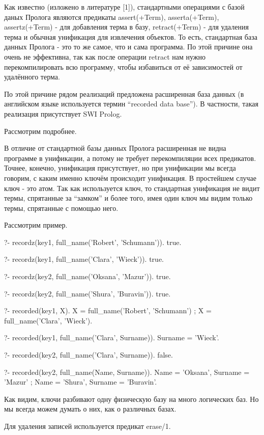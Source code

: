 \documentclass[a4paper]{book}
\begin{document}
Как известно (изложено в литературе [1]), стандартными операциями
с базой даных Пролога являются предикаты  assert(+Term),
asserta(+Term), assertz(+Term) - для добавления терма в базу,
retract(+Term) - для удаления терма и обычная унификация для
извлечения объектов. То есть, стандартная база данных Пролога -
это то же самое, что и сама программа. По этой причине она очень
не эффективна, так как после операции retract нам нужно
перекомпилировать всю программу, чтобы избавиться от её
зависимостей от удалённого терма.

По этой причине рядом реализаций предложена расширенная база
данных (в английском языке используется термин ``recorded data
base''). В частности, такая реализация присутствует SWI Prolog.

Рассмотрим подробнее.

В отличие от стандартной базы данных Пролога расширенная не видна
программе в унификации, а потому не требует перекомпиляции всех
предикатов. Точнее, конечно, унификация присутствует, но при
унификации мы всегда говорим, с каким именно ключём происходит
унификация. В простейшем случае ключ - это атом. Так как
используется ключ, то стандартная унификация не видит термы,
спрятанные за ``замком'' и более того, имея один ключ мы видим
только термы, спрятанные с помощью него.

Рассмотрим пример.

\begin{example}{}{}
?- recordz(key1, full_name('Robert', 'Schumann')).
true.

?- recordz(key1, full_name('Clara', 'Wieck')).
true.

?- recordz(key2, full_name('Oksana', 'Mazur')).
true.

?- recordz(key2, full_name('Shura', 'Buravin')).
true.

?- recorded(key1, X).
X = full_name('Robert', 'Schumann') ;
X = full_name('Clara', 'Wieck').

?- recorded(key1, full_name('Clara', Surname)).
Surname = 'Wieck'.

?- recorded(key2, full_name('Clara', Surname)).
false.

?- recorded(key2, full_name(Name, Surname)).
Name = 'Oksana',
Surname = 'Mazur' ;
Name = 'Shura',
Surname = 'Buravin'.
\end{example}

Как видим, ключи разбивают одну физическую базу на много
логических баз. Но мы всегда можем думать о них, как о различных
базах.

Для удаления записей используется предикат erase/1.
\end{document}
